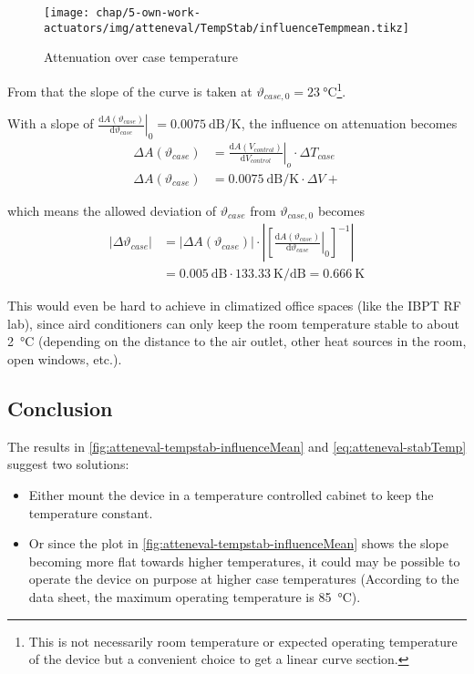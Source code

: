\begin{figure}[tb]
	\centering
	\texttt{[image: chap/5-own-work-actuators/img/atteneval/TempStab/influenceTempmean.tikz]}
	\caption{Attenuation over case temperature}
	\label{fig:atteneval-tempstab-influenceMean}
\end{figure}

From that the slope of the curve is taken at $\vartheta_{case,0}=\SI{23}{\degreeCelsius}$\footnote{This is not necessarily room temperature or expected operating temperature of the device but a convenient choice to get a linear curve section.}.

With a slope of $\left.\frac{\text{d}A(\vartheta_{case})}{\text{d}\vartheta_{case}}\right|_{0} = \SI{0.0075}{\dB\per\kelvin}$, the influence on attenuation becomes
\begin{align}
\Delta A(\vartheta_{case}) &= \left.\frac{\text{d}A(V_{control})}{\text{d}V_{control}}\right|_{o} \cdot \Delta T_{case} \\
\Delta A(\vartheta_{case}) &= \SI{0.0075}{\dB\per\kelvin} \cdot \Delta V+
\end{align}

which means the allowed deviation of $\vartheta_{case}$ from $\vartheta_{case,0}$ becomes
\begin{align}\label{eq:atteneval-stabTemp}
\left|\Delta \vartheta_{case}\right| &= \left|\Delta A(\vartheta_{case})\right| \cdot 
\left|\left[\left.\frac{\text{d}A(\vartheta_{case})}{\text{d}\vartheta_{case}}\right|_{0}\right]^{-1}\right| \\
 &= \SI{0.005}{\dB} \cdot \SI{133.33}{\kelvin\per\dB} = \SI{0.666}{\kelvin}
\end{align}

This would even be hard to achieve in climatized office spaces (like the IBPT RF lab), since aird conditioners can only keep the room temperature stable to about \SI{2}{\degreeCelsius} (depending on the distance to the air outlet, other heat sources in the room, open windows, etc.).

\FloatBarrier
\subsection{Conclusion}
The results in \autoref{fig:atteneval-tempstab-influenceMean} and \autoref{eq:atteneval-stabTemp} suggest two solutions:
\begin{itemize}
\item Either mount the device in a temperature controlled cabinet to keep the temperature constant.
\item Or since the plot in \autoref{fig:atteneval-tempstab-influenceMean} shows the slope becoming more flat towards higher temperatures, it could may be possible to operate the device on purpose at higher case temperatures (According to the data sheet\cite{mini-circuitsZX732500VoltageVariable}, the maximum operating temperature is \SI{85}{\degreeCelsius}).
\end{itemize}

